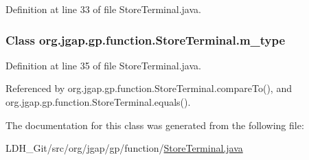 Definition at line 33 of file Store\-Terminal.\-java.

\hypertarget{classorg_1_1jgap_1_1gp_1_1function_1_1_store_terminal_a0abbccf6fa579fc39df324bd1746d5d2}{
\subsubsection[{m\-\_\-type}]{\setlength{\rightskip}{0pt plus 5cm}Class org.\-jgap.\-gp.\-function.\-Store\-Terminal.\-m\-\_\-type\hspace{0.3cm}{\ttfamily [private]}}}\label{classorg_1_1jgap_1_1gp_1_1function_1_1_store_terminal_a0abbccf6fa579fc39df324bd1746d5d2}


Definition at line 35 of file Store\-Terminal.\-java.



Referenced by org.\-jgap.\-gp.\-function.\-Store\-Terminal.\-compare\-To(), and org.\-jgap.\-gp.\-function.\-Store\-Terminal.\-equals().



The documentation for this class was generated from the following file\-:\begin{DoxyCompactItemize}
\item 
L\-D\-H\-\_\-\-Git/src/org/jgap/gp/function/\hyperlink{_store_terminal_8java}{Store\-Terminal.\-java}\end{DoxyCompactItemize}
